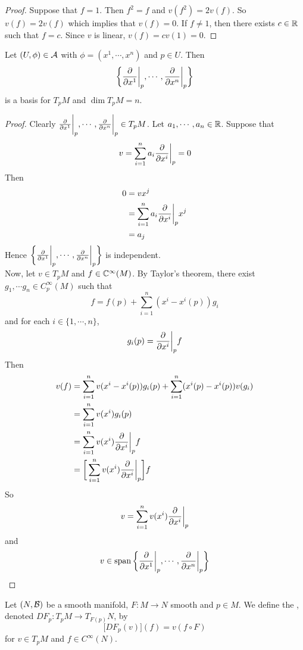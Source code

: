 \documentclass{book}
\begin{document}
	\begin{proof}
		Suppose that $f = 1$. Then $f^2 = f$ and $v(f^2) = 2v(f)$. So $v(f) = 2v(f)$ which implies that $v(f) = 0$. If $f \neq 1$, then there exists $c \in \mathbb{R}$ such that $f = c$. Since $v$ is linear, $v(f) = cv(1) = 0$.
	\end{proof}

	\begin{ex}
		Let $(U, \phi) \in \mathcal{A}$ with $\phi = (x^1, \cdots, x^n)$ and $p \in U$. Then $$ \bigg \{\frac{\partial}{\partial x^1} \bigg|_p, \cdots, \frac{\partial}{\partial x^n} \bigg|_p \bigg \}$$ is a basis for $T_pM$ and $\dim T_pM = n$.
	\end{ex}

	\begin{proof}
		Clearly $\frac{\partial}{\partial x^1} \bigg|_p, \cdots, \frac{\partial}{\partial x^n} \bigg|_p \in T_pM$. Let $a_1, \cdots, a_n \in \mathbb{R}$. Suppose that $$v = \sum_{i=1}^n a_i \frac{\partial}{\partial x^i} \bigg |_p  = 0$$
		Then 
		\begin{align*}
			0
			&= v x^j \\
			&= \sum_{i=1}^n a_i \frac{\partial}{\partial x^i} \bigg |_p  x^j \\
			&= a_j
		\end{align*}
		Hence $\bigg \{\frac{\partial}{\partial x^1} \bigg|_p, \cdots, \frac{\partial}{\partial x^n} \bigg|_p \bigg \}$ is independent.\\
		Now, let $v \in T_pM$ and $f \in \mathbb{C}^{\infty}(M)$. By Taylor's theorem, there exist $g_1, \cdots g_n \in C_p^{\infty}(M)$ such that $$f = f(p) + \sum_{i=1}^n(x^i - x^i(p)) g_i$$ and for each $i \in \{1, \cdots, n\}$, $$g_i(p) = \frac{\partial}{\partial x^i} \bigg |_p  f $$ Then 
		\begin{align*}
			v(f)
			&= \sum_{i=1}^nv(x^i - x^i(p)) g_i(p) + \sum_{i=1}^n(x^i(p) - x^i(p)) v(g_i) \\
			&= \sum_{i=1}^nv(x^i)g_i(p) \\
			&= \sum_{i=1}^nv(x^i)\frac{\partial}{\partial x^i} \bigg |_p  f \\
			&= \bigg[ \sum_{i=1}^nv(x^i)\frac{\partial}{\partial x^i} \bigg |_p  \bigg] f
		\end{align*}
		So $$v = \sum_{i=1}^nv(x^i)\frac{\partial}{\partial x^i} \bigg |_p  $$ and $$v \in \operatorname{span} \bigg \{\frac{\partial}{\partial x^1} \bigg|_p, \cdots, \frac{\partial}{\partial x^n} \bigg|_p \bigg \}$$
	\end{proof}



	\begin{defn}
		Let $(N, \mathcal{B})$ be a smooth manifold, $F: M \rightarrow N$ smooth and $p \in M$. We define the , denoted $DF_p: T_pM \rightarrow T_{F(p)}N$, by $$\bigg[ DF_p(v) \bigg] (f) = v (f \circ F)$$  for $v \in T_pM$ and $f \in C^{\infty}(N)$.
	\end{defn}
	
\end{document}
